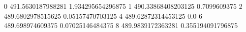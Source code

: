 0 491.5630187988281 1.934295654296875
1 490.33868408203125 0.7099609375
2 489.6802978515625 0.05157470703125
4 489.62872314453125 0.0
6 489.698974609375 0.07025146484375
8 489.9839172363281 0.355194091796875
